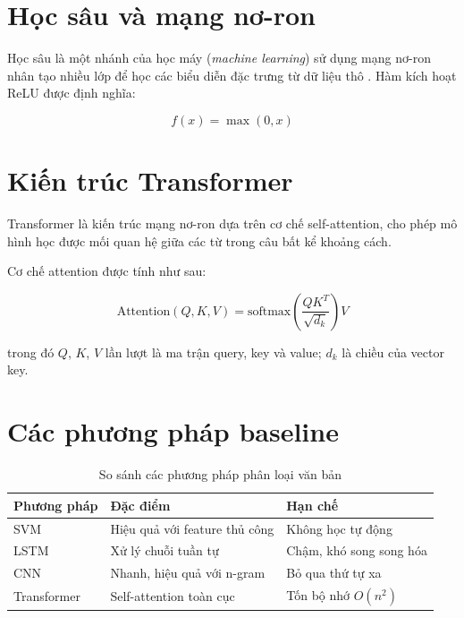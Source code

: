 \documentclass[12pt, a4paper]{report}
\begin{document}
\section{Học sâu và mạng nơ-ron}

Học sâu là một nhánh của học máy (\textit{machine learning}) sử dụng mạng
nơ-ron nhân tạo nhiều lớp để học các biểu diễn đặc trưng từ dữ liệu thô
\cite{LeCun2015deep}. Hàm kích hoạt ReLU được định nghĩa:

\begin{equation}
  \label{eq:relu}
  f(x) = \max(0, x)
\end{equation}

\section{Kiến trúc Transformer}

Transformer \cite{Vaswani2017attention} là kiến trúc mạng nơ-ron dựa trên
cơ chế self-attention, cho phép mô hình học được mối quan hệ giữa các từ
trong câu bất kể khoảng cách.

Cơ chế attention được tính như sau:

\begin{equation}
  \label{eq:attention}
  \text{Attention}(Q, K, V) = \text{softmax}\!\left(\frac{QK^T}{\sqrt{d_k}}\right) V
\end{equation}

trong đó $Q$, $K$, $V$ lần lượt là ma trận query, key và value;
$d_k$ là chiều của vector key.

\section{Các phương pháp baseline}

\begin{table}[htbp]
  \centering
  \caption{So sánh các phương pháp phân loại văn bản}
  \label{tab:methods}
  \begin{tabular}{lll}
    \toprule
    Phương pháp & Đặc điểm & Hạn chế \\
    \midrule
    SVM         & Hiệu quả với feature thủ công & Không học tự động \\
    LSTM        & Xử lý chuỗi tuần tự & Chậm, khó song song hóa \\
    CNN         & Nhanh, hiệu quả với n-gram & Bỏ qua thứ tự xa \\
    Transformer & Self-attention toàn cục & Tốn bộ nhớ $O(n^2)$ \\
    \bottomrule
  \end{tabular}
\end{table}
\end{document}
